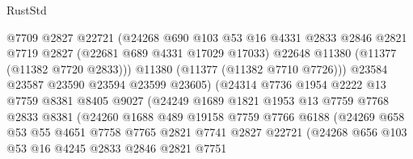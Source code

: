 \begin{lexlean}{RustStd}
\begin{coremodule}
                            @7709
                            @2827
                            @22721
                            (@24268
                              @690
                              @103
                              @53
                              @16
                              @4331
                              @2833
                              @2846
                              @2821
                              @7719
                              @2827
                              (@22681 @689 @4331 @17029 @17033)
                              @22648
                              @11380
                              (@11377 (@11382 @7720 @2833)))
                            @11380
                            (@11377 (@11382 @7710 @7726)))
                          @23584
                          @23587
                          @23590
                          @23594
                          @23599
                          @23605)
                        (@24314
                          @7736
                          @1954
                          @2222
                          @13
                          @7759
                          @8381
                          @8405
                          @9027
                          (@24249
                            @1689
                            @1821
                            @1953
                            @13
                            @7759
                            @7768
                            @2833
                            @8381
                            (@24260
                              @1688
                              @489
                              @19158
                              @7759
                              @7766
                              @6188
                              (@24269
                                @658
                                @53
                                @55
                                @4651
                                @7758
                                @7765
                                @2821
                                @7741
                                @2827
                                @22721
                                (@24268
                                  @656
                                  @103
                                  @53
                                  @16
                                  @4245
                                  @2833
                                  @2846
                                  @2821
                                  @7751

\end{coremodule}
\end{lexlean}
